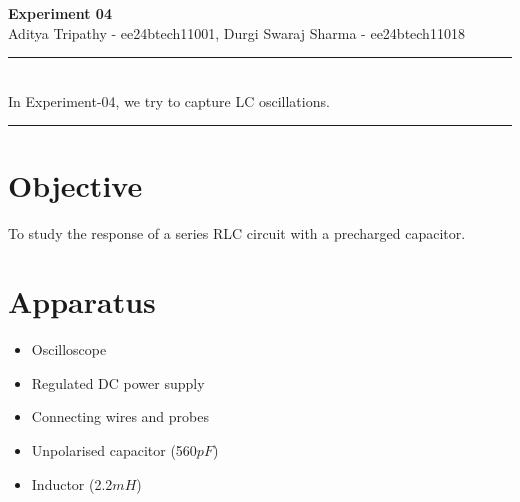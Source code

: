 \documentclass[a4paper,12pt]{article}
\renewenvironment{abstract}
 {\par\noindent\textbf{\abstractname}\ \ignorespaces \\}
 {\par\noindent\medskip}
\begin{document}
\pagestyle{fancy}
\thispagestyle{empty}
\fancyhead[L]{}
\renewcommand*{\thefootnote}{\fnsymbol{footnote}}
\begin{center}
\Large{\textbf{Experiment 04}}
\vspace{0.4cm}
\normalsize
\\ Aditya Tripathy - ee24btech11001, Durgi Swaraj Sharma - ee24btech11018\\
\medskip
\normalsize
\end{center}
{\color{gray}\hrule}
\vspace{0.4cm}
\begin{abstract}
In Experiment-04, we try to capture LC oscillations.
\end{abstract}
{\color{gray}\hrule}
\medskip
\section{Objective}
To study the response of a series RLC circuit with a precharged capacitor.

\section{Apparatus}
\begin{itemize}
\item Oscilloscope
\item Regulated DC power supply
\item Connecting wires and probes
\item Unpolarised capacitor (560$pF$)
\item Inductor (2.2$mH$)
\end{itemize}
\end{document}
